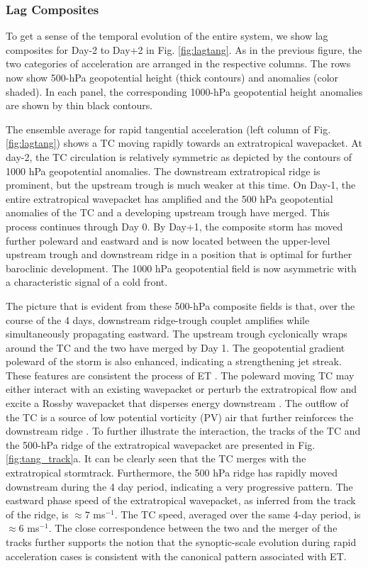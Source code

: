 \documentclass[wcd,manuscript]{copernicus}
\begin{document}
% 



\subsubsection{Lag Composites}
To get a sense of the temporal evolution of the entire system, we show lag composites for Day-2 to Day+2 in Fig. \ref{fig:lagtang}. As in the previous figure, the two categories of acceleration are arranged in the respective columns. The rows now show  500-hPa geopotential height (thick contours) and anomalies (color shaded). In each panel, the corresponding 1000-hPa geopotential height anomalies are shown by thin black contours. 

The ensemble average for rapid tangential acceleration (left column of Fig. \ref{fig:lagtang}) shows a TC moving rapidly towards an extratropical wavepacket. At day-2, the TC circulation is relatively symmetric as depicted by the contours of 1000 hPa geopotential anomalies. The downstream extratropical ridge is prominent, but the upstream trough is much weaker at this time. On Day-1, the entire extratropical wavepacket has amplified and the 500 hPa geopotential anomalies of the TC and a developing upstream trough have merged. This process continues through Day 0. By Day+1, the composite storm has moved further poleward and eastward and is now located between the upper-level upstream trough and downstream ridge in a position that is optimal for further baroclinic development. The 1000 hPa geopotential field is now asymmetric with a characteristic signal of a cold front. 


The picture that is evident from these 500-hPa composite fields is that, over the course of the 4 days, downstream ridge-trough couplet amplifies while simultaneously propagating eastward. The upstream trough cyclonically wraps around the TC and the two have merged by Day 1. The geopotential gradient poleward of the storm is also enhanced, indicating a strengthening jet streak. These features are consistent the process of ET \citep[e.g.,][]{K2019}. The poleward moving TC may either interact with an existing wavepacket or perturb the extratropical flow and excite a Rossby wavepacket that disperses energy downstream \citep[e.g.,][]{RJ2014}. The outflow of the TC is a source of low potential vorticity (PV) air that further reinforces the downstream ridge \citep[e.g.,][]{RJD2008}. To further illustrate the interaction, the tracks of the TC and the 500-hPa ridge of the extratropical wavepacket  are presented in Fig. \ref{fig:tang_track}a. It can be clearly seen that the TC merges with the  extratropical stormtrack. Furthermore, the 500 hPa ridge has rapidly moved downstream during the 4 day period, indicating a very progressive pattern. The eastward phase speed of the extratropical wavepacket,  as inferred from the track of the ridge, is $\approx 7$ ms$^{-1}$. The TC speed, averaged over the same 4-day period,  is $\approx 6$ ms$^{-1}$. The close correspondence between the two and the  merger of the tracks further supports the notion that the synoptic-scale evolution during rapid acceleration cases is consistent with the canonical pattern associated with ET.
\end{document}
